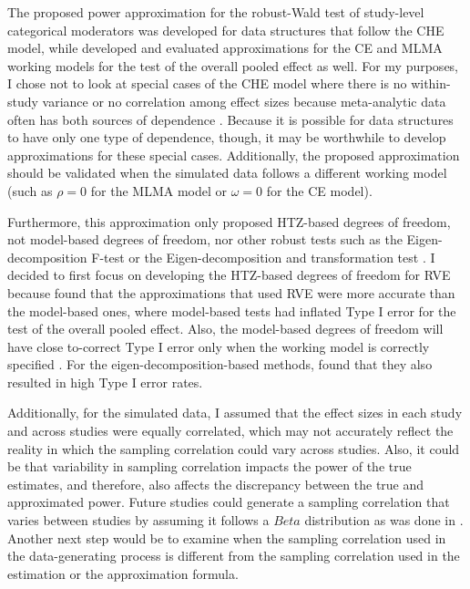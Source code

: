 The proposed power approximation for the robust-Wald test of study-level categorical moderators was developed for data structures that follow the CHE model, while \textcite{vembye2023} developed and evaluated approximations for the CE and MLMA working models for the test of the overall pooled effect as well. For my purposes, I chose not to look at special cases of the CHE model where there is no within-study variance or no correlation among effect sizes because meta-analytic data often has both sources of dependence \autocite{pustejovsky2022}. Because it is possible for data structures to have only one type of dependence, though, it may be worthwhile to develop approximations for these special cases. Additionally, the proposed approximation should be validated when the simulated data follows a different working model (such as $\rho=0$ for the MLMA model or $\omega=0$ for the CE model).

Furthermore, this approximation only proposed HTZ-based degrees of freedom, not model-based degrees of freedom, nor other robust tests such as the Eigen-decomposition F-test or the Eigen-decomposition and transformation test \autocite{tipton2015b}. I decided to first focus on developing the HTZ-based degrees of freedom for RVE because \textcite{vembye2023} found that the approximations that used RVE were more accurate than the model-based ones, where model-based tests had inflated Type I error for the test of the overall pooled effect. Also, the model-based degrees of freedom will have close to-correct Type I error only when the working model is correctly specified \autocite{vembye2023}. For the eigen-decomposition-based methods, \textcite{tipton2015b} found that they also resulted in high Type I error rates. 

Additionally, for the simulated data, I assumed that the effect sizes in each study and across studies were equally correlated, which may not accurately reflect the reality in which the sampling correlation could vary across studies. Also, it could be that variability in sampling correlation impacts the power of the true estimates, and therefore, also affects the discrepancy between the true and approximated power. Future studies could generate a sampling correlation that varies between studies by assuming it follows a $Beta$ distribution as was done in \textcite{tipton2015b, joshi_cluster_2022, vembye2023}. Another next step would be to examine when the sampling correlation used in the data-generating process is different from the sampling correlation used in the estimation or the approximation formula.

